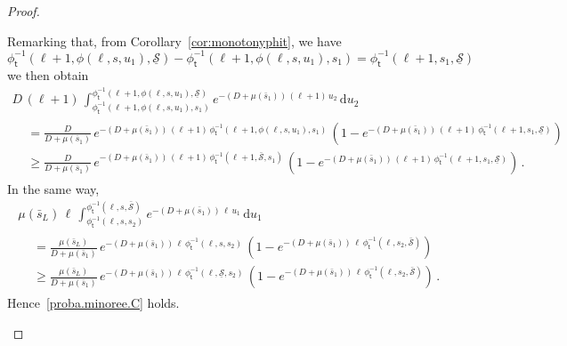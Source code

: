 \documentclass[AHL,Unicode,longabstracts,published]{cedram}
\newcommand{\dif}{\mathrm{d}}
\newcommand{\Smin}{\underline{\mathcal{S}}}
\newcommand{\Smax}{\bar{\mathcal{S}}}
\newcommand{\barmu}{\mu(\bar s_1)}
\newcommand{\phit}{\phi_\textsf{t}^{-1}}
\newcommand{\1}{\mathbf{1}}
\begin{document}
\begin{proof}
\begin{itemize}
Remarking that, from Corollary~\ref{cor:monotonyphit}, we have
\[
\phit(\ell+1,\phi(\ell,s,u_1),\Smin)-\phit(\ell+1,\phi(\ell,s,u_1),s_1)=\phit(\ell+1,s_1,\Smin)
\]
we then obtain
\begin{multline*}
D\,(\ell+1)\,
\int_{\phit(\ell+1,\phi(\ell,s,u_1),s_1)}^{\phit(\ell+1,\phi(\ell,s,u_1),\Smin)} e^{-(D+\barmu)\,(\ell+1)\,u_2}\,\dif u_2
\\
\begin{aligned}
& =
\frac{D}{D+\barmu}\,e^{-(D+\barmu)\,(\ell+1)\,\phit\left(\ell+1,\phi(\ell,s,u_1),s_1\right)}\,
\left(1-e^{-(D+\barmu)\,(\ell+1)\,\phit(\ell+1,s_1,\Smin)}\right)
\\
& \geq
\frac{D}{D+\barmu}\,e^{-(D+\barmu)\,(\ell+1)\,\phit(\ell+1,\Smax,s_1)}\,
\left(1-e^{-(D+\barmu)\,(\ell+1)\,\phit(\ell+1,s_1,\Smin)}\right)\,.
\end{aligned}
\end{multline*}
In the same way,
\begin{multline*}
\mu(\bar s_L) \,\ell\,
\int_{\phit\left(\ell,s,s_2\right)}^{\phit\left(\ell,s,\Smax\right)} e^{-(D+\barmu)\,\ell\,u_1}\,\dif u_1
\\
\begin{aligned}
&=
\frac{\mu(\bar s_L)}{D+\barmu}\,e^{-(D+\barmu)\,\ell\,\phit(\ell,s,s_2)}\,
\left(1-e^{-(D+\barmu)\,\ell\,\phit(\ell,s_2,\Smax)}\right)
\\
&\geq
\frac{\mu(\bar s_L)}{D+\barmu}\,e^{-(D+\barmu)\,\ell\,\phit(\ell,\Smin,s_2)}\,
\left(1-e^{-(D+\barmu)\,\ell\,\phit(\ell,s_2,\Smax)}\right)\,.
\end{aligned}
\end{multline*}
Hence~\eqref{proba.minoree.C} holds.




\end{itemize}
\end{proof}
\end{document}
